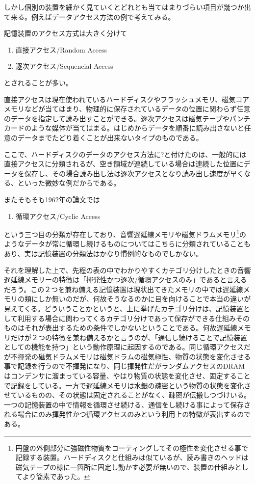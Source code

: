 \documentclass[a4paper,report]{jsbook}
\begin{document}
しかし個別の装置を細かく見ていくとどれとも当てはまりづらい項目が幾つか出て来る。例えばデータアクセス方法の例で考えてみる。

記憶装置のアクセス方式は大きく分けて

\begin{enumerate}
\def\labelenumi{\arabic{enumi}.}
\tightlist
\item
  直接アクセス/Random Access
\item
  逐次アクセス/Sequencial Access
\end{enumerate}

とされることが多い。

直接アクセスは現在使われているハードディスクやフラッシュメモリ、磁気コアメモリなどが当てはまり、物理的に保存されているデータの位置に関わらず任意のデータを指定して読み出すことができる。逐次アクセスは磁気テープやパンチカードのような媒体が当てはまる。はじめからデータを順番に読み出さないと任意のデータまでたどり着くことが出来ないタイプのものである。

ここで、ハードディスクのデータのアクセス方法に?と付けたのは、一般的には直接アクセスに分類されるが、空き領域が連続している場合は連続した位置にデータを保存し、その場合読み出し法は逐次アクセスとなり読み出し速度が早くなる、といった微妙な例だからである。

またそもそも1962年の論文では

\begin{enumerate}
\def\labelenumi{\arabic{enumi}.}
\tightlist
\item
  循環アクセス/Cyclic Access
\end{enumerate}

という三つ目の分類が存在しており、音響遅延線メモリや磁気ドラムメモリ\footnote{円盤の外側部分に強磁性物質をコーティングしてその極性を変化させる事で記録する装置。ハードディスクと仕組みは似ているが、読み書きのヘッドは磁気テープの様に一箇所に固定し動かす必要が無いので、装置の仕組みとしてより簡素であった。}のようなデータが常に循環し続けるものについてはこちらに分類されている\autocite{ishii:memory}こともあり、実は記憶装置の分類法はかなり慣例的なものでしかない。

それを理解した上で、先程の表の中でわかりやすくカテゴリ分けしたときの音響遅延線メモリーの特徴は「揮発性かつ逐次/循環アクセスのみ」であると言えるだろう。この２つを兼ね備える記憶装置は現状出てきたメモリの中では遅延線メモリの類にしか無いのだが、何故そうなるのかに目を向けることで本当の違いが見えてくる。どういうことかというと、上に挙げたカテゴリ分けは、記憶装置として利用する場合に関わってくるカテゴリ分けであって保存ができる仕組みそのものはそれが表出するための条件でしかないということである。何故遅延線メモリだけが２つの特徴を兼ね備えるかと言うのが、「通信し続けることで記憶装置としての機能を持つ」という動作原理に起因するのである。同じ循環アクセスだが不揮発の磁気ドラムメモリは磁気ドラムの磁気極性、物質の状態を変化させる事で記録を行うので不揮発になり、同じ揮発性だがランダムアクセスのDRAMはコンデンサに溜まっている容量、やはり物質の状態を変化させ、固定することで記録をしている。一方で遅延線メモリは水銀の疎密という物質の状態を変化させているものの、その状態は固定されることがなく、疎密が伝搬しつづけいる。一つの記憶装置の中で情報を循環させ続ける、通信をし続ける事によって保存される場合にのみ揮発性かつ循環アクセスのみという利用上の特徴が表出するのである。
\end{document}
